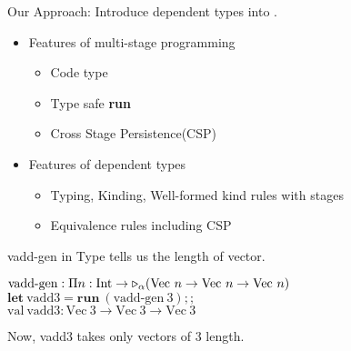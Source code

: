 \documentclass[dvipdfmx,aspectratio=169, 20pt]{beamer}
\begin{document}

\begin{frame}[fragile]{Our Approach: \LMD}
    Introduce dependent types into .
    \begin{itemize}
        \item Features of multi-stage programming
            \begin{itemize}
                \item Code type
                \item Type safe {\bf{run}}
                \item Cross Stage Persistence(CSP)
            \end{itemize}
        \item Features of dependent types
            \begin{itemize}
                \item Typing, Kinding, Well-formed kind rules with stages
                \item Equivalence rules including CSP
            \end{itemize}
    \end{itemize}
\end{frame}

\begin{frame}[fragile]{vadd-gen in \LMD}
    Type tells us the length of vector.
    \newcommand{\Vn}{\text{Vec}\ n}
    \newcommand{\Vt}{\text{Vec}\ 3}
    \begin{tabbing}
        \( \text{vadd-gen} : \Pi n:\I \to \TW_\alpha (\Vn \to \Vn \to \Vn) \) \\[2mm]
        \( \textbf{let}\ \text{vadd3} = \textbf{run}\ (\text{vadd-gen}\ 3);; \) \\
        \( \text{val}\ \text{vadd3} : \Vt \to \Vt \to \Vt \) \\[2mm]
    \end{tabbing}
    Now, vadd3 takes only vectors of 3 length.
\end{frame}
\end{document}

